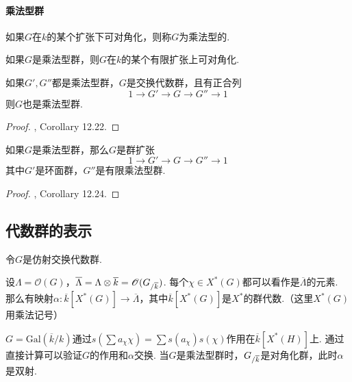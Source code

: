 \paragraph*{乘法型群}

\begin{cdef}
    如果$G$在$k$的某个扩张下可对角化，则称$G$为乘法型的.
\end{cdef}

\begin{cprop}
    如果$G$是乘法型群，则$G$在$k$的某个有限扩张上可对角化.
\end{cprop}

\begin{cprop}
    如果$G',G''$都是乘法型群，$G$是交换代数群，且有正合列
    \begin{equation}
        1\to G'\to G\to G''\to 1
    \end{equation}
    则$G$也是乘法型群.
\end{cprop}

\begin{proof}
    \cite{milne2017algebraic}, Corollary 12.22.
\end{proof}

\begin{cprop}
    如果$G$是乘法型群，那么$G$是群扩张
    \begin{equation}
        1\to G'\to G\to G''\to 1
    \end{equation}
    其中$G'$是环面群，$G''$是有限乘法型群.
\end{cprop}

\begin{proof}
    \cite{milne2017algebraic}, Corollary 12.24.
\end{proof}

\subsection{代数群的表示}

令$G$是仿射交换代数群.

设$\Lambda = \mathscr{O}(G)$，$\overline{\Lambda} = \Lambda \otimes \overline{k} = \mathscr{O}({G}_{/\overline{k}})$.
每个$\chi\in X^{*}(G)$都可以看作是$\overline{\Lambda}$的元素.
那么有映射$\alpha: \overline{k}[X^{*}(G)] \to \overline{\Lambda}$，其中$\overline{k}[X^{*}(G)]$是$X^{*}$的群代数.（这里$X^{*}(G)$用乘法记号）

$G = \mathrm{Gal}(\overline{k}/k)$通过$s(\sum a_{\chi} \chi) = \sum s(a_{\chi}) s(\chi)$作用在$\overline{k}[X^{*}(H)]$上.
通过直接计算可以验证$G$的作用和$\alpha$交换.
当$G$是乘法型群时，${G}_{/\overline{k}}$是对角化群，此时$\alpha$是双射.

